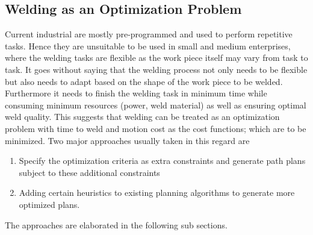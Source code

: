 \newpage
\subsection{Welding as an Optimization Problem}
Current industrial are mostly pre-programmed and used to perform repetitive tasks. Hence they are unsuitable to be used in small and medium enterprises, where the welding tasks are flexible as the work piece itself may vary from task to task. It goes without saying that the welding process not only needs to be flexible but also needs to adapt based on the shape of the work piece to be welded. Furthermore it needs to finish the welding task in minimum time while consuming minimum resources (power, weld material) as well as ensuring optimal weld quality. This suggests that welding can be treated as an optimization problem with time to weld and motion cost as the cost functions; which are to be minimized. Two major approaches usually taken in this regard are 
\begin{enumerate}
\item Specify the optimization criteria as extra constraints and generate path plans subject to these additional constraints
\item Adding certain heuristics to existing planning algorithms to generate more optimized plans.
\end{enumerate}
The approaches are elaborated in the following sub sections.
